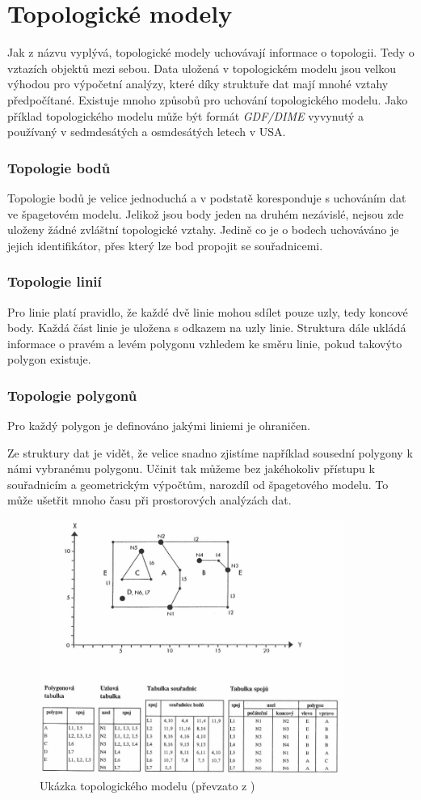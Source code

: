 \section{Topologické modely}
	Jak z názvu vyplývá, topologické modely uchovávají informace o topologii. Tedy o vztazích objektů mezi sebou. Data uložená v topologickém modelu jsou velkou výhodou pro výpočetní analýzy, které díky struktuře dat mají mnohé vztahy předpočítané. Existuje mnoho způsobů pro uchování topologického modelu. Jako příklad topologického modelu může být formát \textit{GDF/DIME} vyvynutý a používaný v sedmdesátých a osmdesátých letech v USA. \cite{walford2002geographical}

\subsubsection{Topologie bodů}
	Topologie bodů je velice jednoduchá a v podstatě koresponduje s uchováním dat ve špagetovém modelu. Jelikož jsou body jeden na druhém nezávislé, nejsou zde uloženy žádné zvláštní topologické vztahy. Jedině co je o bodech uchováváno je jejich identifikátor, přes který lze bod propojit se souřadnicemi.
	
\subsubsection{Topologie linií}
	Pro linie platí pravidlo, že každé dvě linie mohou sdílet pouze uzly, tedy koncové body. Každá část linie je uložena s odkazem na uzly linie. Struktura dále ukládá informace o pravém a levém polygonu vzhledem ke směru linie, pokud takovýto polygon existuje.

\subsubsection{Topologie polygonů}
	Pro každý polygon je definováno jakými liniemi je ohraničen. 
	
Ze struktury dat je vidět, že velice snadno zjistíme například sousední polygony k námi vybranému polygonu. Učinit tak můžeme bez jakéhokoliv přístupu k souřadnicím a geometrickým výpočtům, narozdíl od špagetového modelu. To může ušetřit mnoho času při prostorových analýzách dat. \cite{QGIS_software} \cite{tucek1997geograficke} \cite{kolar2003geograficke} \cite{vesely2007thesis}

\begin{figure}[h]
  \centering
  \includegraphics[width=10cm]{./pictures/3/topo_model.png}
  \caption{Ukázka topologického modelu (převzato z \cite{kolar2003geograficke})}
  \label{fig:3-time_complexity}
\end{figure}
